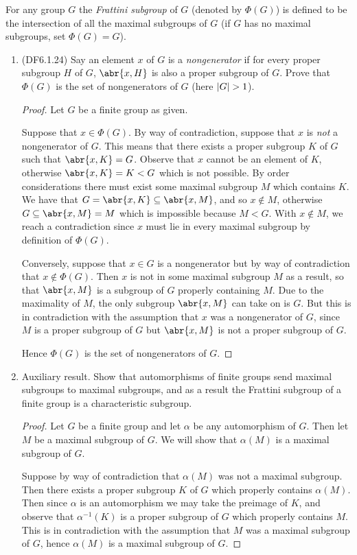\documentclass[11pt]{article}
\begin{document}
For any group $G$ the \textit{Frattini subgroup} of $G$ (denoted by $\varPhi(G)$) is defined to be the intersection of all the maximal subgroups of $G$ (if $G$ has no maximal subgroups, set $\varPhi(G) = G$).
\begin{enumerate}
    \item (DF6.1.24) Say an element $x$ of $G$ is a \textit{nongenerator} if for every proper subgroup $H$ of $G$, $\abr{x,H}$ is also a proper subgroup of $G$. Prove that $\varPhi(G)$ is the set of nongenerators of $G$ (here $\abs{G} > 1$).
    \begin{proof} Let $G$ be a finite group as given.

      Suppose that $x\in \varPhi(G)$. By way of contradiction, suppose that $x$ is \textit{not} a nongenerator of $G$. This means that there exists a proper subgroup $K$ of $G$ such that $\abr{x,K} = G$. Observe that $x$ cannot be an element of $K$, otherwise $\abr{x,K} = K < G$ which is not possible. By order considerations there must exist some maximal subgroup $M$ which contains $K$. We have that $G = \abr{x,K}\subseteq \abr{x,M}$, and so $x\not\in M$, otherwise $G \subseteq \abr{x,M} = M$ which is impossible because $M <G$. With $x\not\in M$, we reach a contradiction since $x$ must lie in every maximal subgroup by definition of $\varPhi(G)$.

      Conversely, suppose that $x\in G$ is a nongenerator but by way of contradiction that $x\not\in \varPhi(G)$. Then $x$ is not in some maximal subgroup $M$ as a result, so that $\abr{x,M}$ is a subgroup of $G$ properly containing $M$. Due to the maximality of $M$, the only subgroup $\abr{x,M}$ can take on is $G$. But this is in contradiction with the assumption that $x$ was a nongenerator of $G$, since $M$ is a proper subgroup of $G$ but $\abr{x,M}$ is not a proper subgroup of $G$.

      Hence $\varPhi(G)$ is the set of nongenerators of $G$.
    \end{proof}
    \item Auxiliary result. Show that automorphisms of finite groups send maximal subgroups to maximal subgroups, and as a result the Frattini subgroup of a finite group is a characteristic subgroup.
    \begin{proof}
      Let $G$ be a finite group and let $\alpha$ be any automorphism of $G$. Then let $M$ be a maximal subgroup of $G$. We will show that $\alpha(M)$ is a maximal subgroup of $G$.

      Suppose by way of contradiction that $\alpha(M)$ was not a maximal subgroup. Then there exists a proper subgroup $K$ of $G$ which properly contains $\alpha(M)$. Then since $\alpha$ is an automorphism we may take the preimage of $K$, and observe that $\alpha^{-1}(K)$ is a proper subgroup of $G$ which properly contains $M$. This is in contradiction with the assumption that $M$ was a maximal subgroup of $G$, hence $\alpha(M)$ is a maximal subgroup of $G$.


\end{proof}
\end{enumerate}
\end{document}
